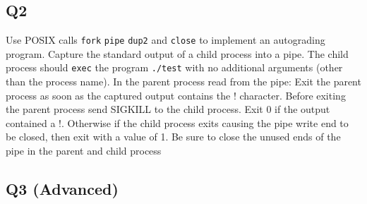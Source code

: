\begin{Shaded}
\begin{Highlighting}[]
 
   \NormalTok{;}
  \NormalTok{) \{}
    \NormalTok{) \{ }
       \NormalTok{buffer[}\NormalTok{];}
       
      \NormalTok{write( fds[}\NormalTok{], ______,______ ); }
      \NormalTok{dup2( fds[}\NormalTok{],  ______);}
      \NormalTok{, }\NormalTok{,  ______ );}
      \NormalTok{);}
    \NormalTok{\}}
    \NormalTok{);}
  \NormalTok{\}}
   \NormalTok{;}
\NormalTok{\}}
\end{Highlighting}
\end{Shaded}

\subsection{Q2}\label{q2-3}

Use POSIX calls \texttt{fork} \texttt{pipe} \texttt{dup2} and
\texttt{close} to implement an autograding program. Capture the standard
output of a child process into a pipe. The child process should
\texttt{exec} the program \texttt{./test} with no additional arguments
(other than the process name). In the parent process read from the pipe:
Exit the parent process as soon as the captured output contains the !
character. Before exiting the parent process send SIGKILL to the child
process. Exit 0 if the output contained a !. Otherwise if the child
process exits causing the pipe write end to be closed, then exit with a
value of 1. Be sure to close the unused ends of the pipe in the parent
and child process

\subsection{Q3 (Advanced)}\label{q3-advanced}

